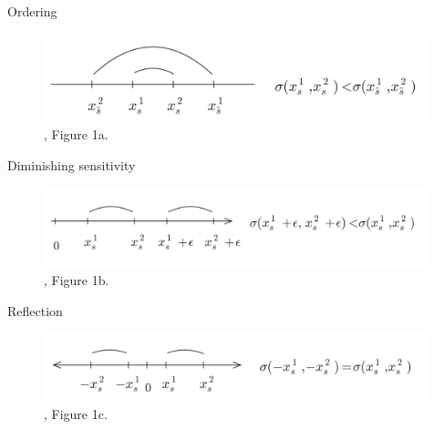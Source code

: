 \begin{frame}{Ordering}
\begin{figure}
\centering
    \includegraphics[width = 0.99\textwidth]{ordering}
    \caption{\citet{BordaloGennaioliShleifer2012}, Figure 1a.}
    \end{figure}
\end{frame}

\begin{frame}{Diminishing sensitivity}
\begin{figure}
\centering
    \includegraphics[width = 0.99\textwidth]{diminishing_sensitivity}
    \caption{\citet{BordaloGennaioliShleifer2012}, Figure 1b.}
    \end{figure}
\end{frame}


\begin{frame}{Reflection}
\begin{figure}
\centering
    \includegraphics[width = 0.99\textwidth]{reflection}
    \caption{\citet{BordaloGennaioliShleifer2012}, Figure 1c.}
    \end{figure}
\end{frame}

